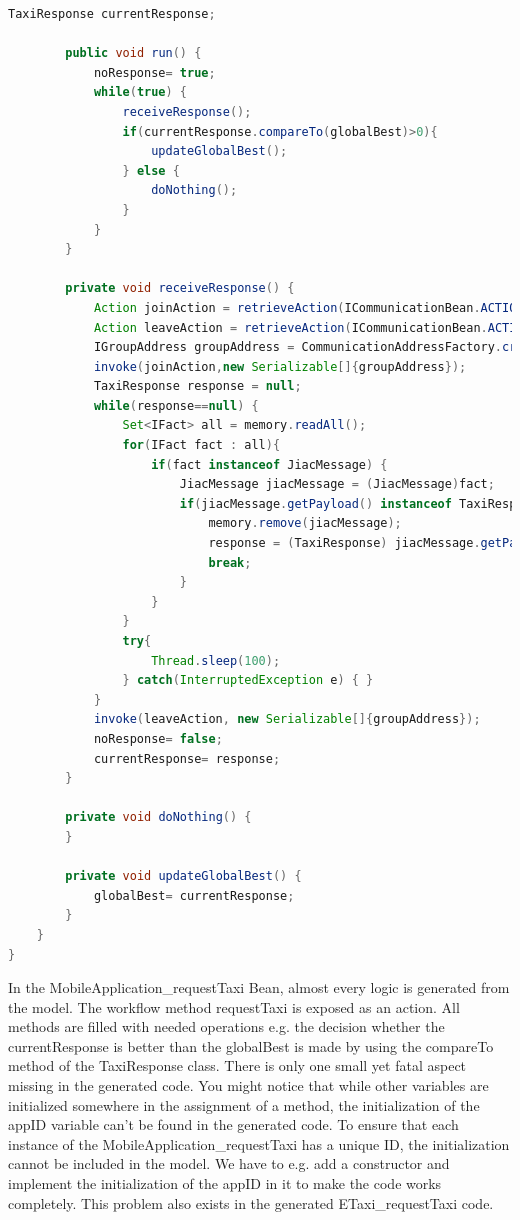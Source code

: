 \begin{lstlisting}[language=java, caption= Generated Agent Bean - MobileApplication\_requestTaxi]
		TaxiResponse currentResponse;
		
		public void run() {
			noResponse= true;
			while(true) {
				receiveResponse();
				if(currentResponse.compareTo(globalBest)>0){
					updateGlobalBest();
				} else {
					doNothing();
				}
			}
		}
	 
		private void receiveResponse() {
			Action joinAction = retrieveAction(ICommunicationBean.ACTION_JOIN_GROUP);
			Action leaveAction = retrieveAction(ICommunicationBean.ACTION_LEAVE_GROUP);
			IGroupAddress groupAddress = CommunicationAddressFactory.createGroupAddress("TaxiResponseTo"+appID+"");
			invoke(joinAction,new Serializable[]{groupAddress});
			TaxiResponse response = null;
			while(response==null) {
				Set<IFact> all = memory.readAll();
				for(IFact fact : all){
					if(fact instanceof JiacMessage) {
						JiacMessage jiacMessage = (JiacMessage)fact;
						if(jiacMessage.getPayload() instanceof TaxiResponse && jiacMessage.getHeader(IJiacMessage.Header.SEND_TO).equals("TaxiResponseTo"+appID+"")) {
							memory.remove(jiacMessage);
							response = (TaxiResponse) jiacMessage.getPayload();
							break;
						}
					}
				}
				try{
					Thread.sleep(100);
				} catch(InterruptedException e) { }
			}
			invoke(leaveAction, new Serializable[]{groupAddress});
			noResponse= false;
			currentResponse= response;
		}
	 
		private void doNothing() {
		}
	 
		private void updateGlobalBest() {
			globalBest= currentResponse;
		} 
	}
}
\end{lstlisting}

In the MobileApplication\_requestTaxi Bean, almost every logic is generated from the model. The workflow method requestTaxi is exposed as an action. All methods are filled with needed operations e.g. the decision whether the currentResponse is better than the globalBest is made by using the compareTo method of the TaxiResponse class. There is only one small yet fatal aspect missing in the generated code. You might notice that while other variables are initialized somewhere in the assignment of a method, the initialization of the appID variable can't be found in the generated code. To ensure that each instance of the MobileApplication\_requestTaxi has a unique ID, the initialization cannot be included in the model. We have to e.g. add a constructor and implement the initialization of the appID in it to make the code works completely. This problem also exists in the generated ETaxi\_requestTaxi code.

